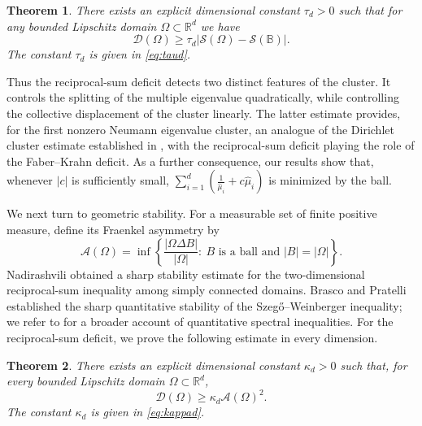 \documentclass{amsart}
\numberwithin{equation}{section}
\theoremstyle{plain}
\newtheorem{theorem}{Theorem}[section]
\theoremstyle{definition}
\theoremstyle{plain}
\theoremstyle{remark}
\numberwithin{figure}{section}
\newcommand{\B}{\mathbb{B}}
\newcommand{\muu}{\widehat{\mu}}
\newcommand{\D}{\mathcal{D}(\Omega)}
\newcommand{\A}{\mathcal{A}(\Omega)}
\newcommand{\s}{\mathcal{S}(\Omega)}
\begin{document}
\begin{theorem}
    \label{thm:sumstability}
    There exists an explicit dimensional constant $\tau_d>0$ such that for any bounded Lipschitz domain $\Omega\subset\mathbb{R}^d$ we have
    \begin{equation}
        \label{eq:sumstability}
        \D \geq \tau_d \left|\s - \mathcal{S}(\B) \right|.
    \end{equation}
    The constant $\tau_d$ is given in \eqref{eq:taud}.
\end{theorem} 

Thus the reciprocal-sum deficit detects two distinct features of the cluster. It controls the splitting of the multiple eigenvalue quadratically, while controlling the collective displacement of the cluster linearly. The latter estimate provides, for the first nonzero Neumann eigenvalue cluster, an analogue of the Dirichlet cluster estimate established in \cite{BLNP26}, with the reciprocal-sum deficit playing the role of the Faber--Krahn deficit. As a further consequence, our results show that, whenever $|c|$ is sufficiently small, $\sum_{i=1}^{d}\left(\frac{1}{\muu_i} + c \muu_i\right)$ is minimized by the ball.

We next turn to geometric stability. For a measurable set of finite positive measure, define its Fraenkel asymmetry by
\begin{equation}
    \label{eq:Fraenkel}
    \A=\inf\left\{\frac{|\Omega\Delta B|}{|\Omega|}:~B\text{ is a ball and }|B|=|\Omega|\right\}.
\end{equation}
Nadirashvili \cite{Nad97} obtained a sharp stability estimate for the two-dimensional reciprocal-sum inequality among simply connected domains. Brasco and Pratelli \cite{BP12} established the sharp quantitative stability of the Szeg\H{o}--Weinberger inequality; we refer to \cite{BD17} for a broader account of quantitative spectral inequalities. For the reciprocal-sum deficit, we prove the following estimate in every dimension.

\begin{theorem}
    \label{thm:recsumfraenkel}
    There exists an explicit dimensional constant $\kappa_d>0$ such that, for every bounded Lipschitz domain $\Omega\subset\mathbb{R}^d$,
    \begin{equation}
        \label{eq:FraenkelStability}
        \D \geq \kappa_d\A^2.
    \end{equation}
    The constant $\kappa_d$ is given in \eqref{eq:kappad}.
\end{theorem}
\end{document}
